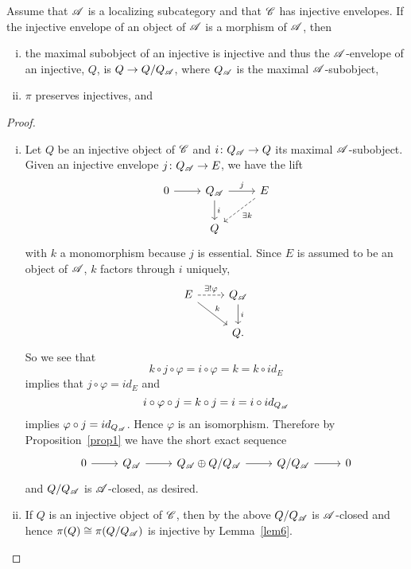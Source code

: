 \documentclass[10pt]{amsart}
\begin{document}
\begin{cor}\label{cor2}
    Assume that $\mathscr{A}$ is a localizing subcategory and that $\mathscr{C}$ has injective envelopes.
    If the injective envelope of an object of $\mathscr{A}$ is a morphism of $\mathscr{A}$, then
    \begin{enumerate}[(i)]
      \item\label{cor2.1}
        the maximal subobject of an injective is injective and thus the $\mathscr{A}$-envelope of an injective, $Q$, is $Q \rightarrow Q/Q_{\mathscr{A}}$, where $Q_{\mathscr{A}}$ is the maximal $\mathscr{A}$-subobject, 
      \item\label{cor2.2}
        $\pi$ preserves injectives, and
    \end{enumerate}
    \begin{proof}
      \begin{enumerate}[(i)]
      \item
        Let $Q$ be an injective object of $\mathscr{C}$ and $i \colon Q_{\mathscr{A}} \rightarrow Q$ its maximal $\mathscr{A}$-subobject.
        Given an injective envelope $j \colon Q_{\mathscr{A}} \rightarrow E$, we have the lift
        $$\begin{tikzcd}
          0 \arrow{r} & Q_\A \arrow{d}{i} \arrow{r}{j} & E \arrow[dashed]{ld}{\exists k}\\
          & Q
        \end{tikzcd}$$
        with $k$ a monomorphism because $j$ is essential.
        Since $E$ is assumed to be an object of $\mathscr{A}$, $k$ factors through $i$ uniquely,
        $$\begin{tikzcd}
          E \arrow{rd}{k}\arrow[dashed]{r}{\exists !\varphi} & Q_\A\arrow{d}{i}\\
          & Q.
        \end{tikzcd}$$
        So we see that
        $$k \circ j \circ \varphi = i \circ \varphi = k = k \circ id_E$$
        implies that  $j \circ \varphi = id_E$
        and
        $$i \circ \varphi \circ j = k \circ j = i = i \circ id_{Q_{\mathscr{A}}}$$
        implies $\varphi \circ j = id_{Q_{\mathscr{A}}}$.
        Hence $\varphi$ is an isomorphism.
        Therefore by Proposition~\ref{prop1} we have the short exact sequence
        $$\begin{tikzcd}
          0 \arrow{r} & Q_\A \arrow{r} & Q_\A \oplus Q/Q_\A \arrow{r} & Q/Q_\A \arrow{r} & 0
        \end{tikzcd}$$
        and $Q/Q_{\mathscr{A}}$ is $\mathscr{A}$-closed, as desired.
      \item
        If $Q$ is an injective object of $\mathscr{C}$, then by the above $Q/Q_{\mathscr{A}}$ is $\mathscr{A}$-closed and hence $\pi(Q) \cong \pi(Q/Q_{\mathscr{A}})$ is injective by Lemma~\ref{lem6}.
        

\end{enumerate}
\end{proof}
\end{cor}
\end{document}
